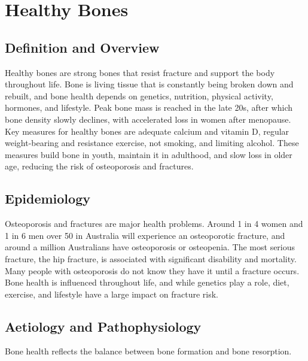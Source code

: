 \chapter{Healthy Bones}

\section*{Definition and Overview}
Healthy bones are strong bones that resist fracture and support the body throughout life. Bone is living tissue that is constantly being broken down and rebuilt, and bone health depends on genetics, nutrition, physical activity, hormones, and lifestyle. Peak bone mass is reached in the late 20s, after which bone density slowly declines, with accelerated loss in women after menopause. Key measures for healthy bones are adequate calcium and vitamin D, regular weight-bearing and resistance exercise, not smoking, and limiting alcohol. These measures build bone in youth, maintain it in adulthood, and slow loss in older age, reducing the risk of osteoporosis and fractures.

\section*{Epidemiology}
Osteoporosis and fractures are major health problems. Around 1 in 4 women and 1 in 6 men over 50 in Australia will experience an osteoporotic fracture, and around a million Australians have osteoporosis or osteopenia. The most serious fracture, the hip fracture, is associated with significant disability and mortality. Many people with osteoporosis do not know they have it until a fracture occurs. Bone health is influenced throughout life, and while genetics play a role, diet, exercise, and lifestyle have a large impact on fracture risk.

\section*{Aetiology and Pathophysiology}
Bone health reflects the balance between bone formation and bone resorption.

